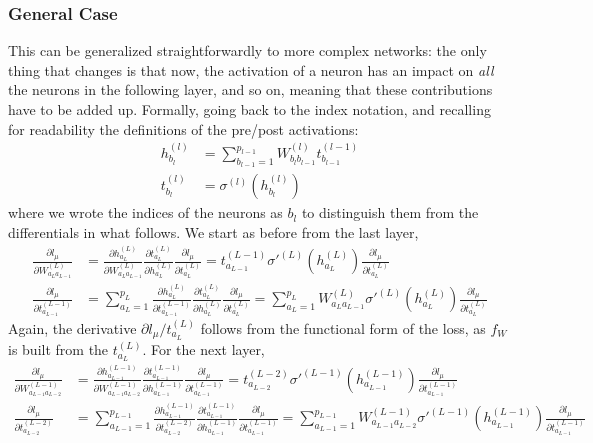 \documentclass{article}
\begin{document}
\subsubsection*{General Case}
This can be generalized straightforwardly to more complex networks: the only thing that changes is that now, the activation of a neuron has an impact on \emph{all} the neurons in the following layer, and so on, meaning that these contributions have to be added up. Formally, going back to the index notation, and recalling for readability the definitions of the pre/post activations:
\begin{align}
    h^{(l)}_{b_{l}} &=
    \sum_{b_{l-1}=1}^{p_{l-1}} W^{(l)}_{b_{l}b_{l-1}} t^{(l-1)}_{b_{l-1}} \\
    t^{(l)}_{b_{l}} &=
    \sigma^{(l)}(h^{(l)}_{b_{l}})
\end{align}
where we wrote the indices of the neurons as $b_l$ to distinguish them from the differentials in what follows. We start as before from the last layer,
\begin{align}
    \frac{\partial l_{\mu}}{\partial W^{(L)}_{a_L a_{L-1}}}
    &=
    \frac{\partial h^{(L)}_{a_L}}{\partial W^{(L)}_{a_L a_{L-1}}}
    \frac{\partial t^{(L)}_{a_L}}{\partial h^{(L)}_{a_L}}
    \frac{\partial l_{\mu}}{\partial t^{(L)}_{a_L}}
    = t^{(L-1)}_{a_{L-1}} \sigma'^{(L)} (h^{(L)}_{a_L})
    \frac{\partial l_{\mu}}{\partial t^{(L)}_{a_L}}
     \\
    \frac{\partial l_{\mu}}{\partial t^{(L-1)}_{a_{L-1}}}
    &=
    \sum_{a_L=1}^{p_L}
    \frac{\partial h^{(L)}_{a_L}}{\partial t^{(L-1)}_{a_{L-1}}}
    \frac{\partial t^{(L)}_{a_L}}{\partial h^{(L)}_{a_L}}
    \frac{\partial l_{\mu}}{\partial t^{(L)}_{a_L}}
    =
    \sum_{a_L=1}^{p_L}
    W^{(L)}_{a_{L}a_{L-1}}
    \sigma'^{(L)} (h^{(L)}_{a_L})
    \frac{\partial l_{\mu}}{\partial t^{(L)}_{a_L}}
\end{align}
Again, the derivative $\partial l_{\mu} / t^{(L)}_{a_L}$ follows from the functional form of the loss, as $f_W$ is built from the $t^{(L)}_{a_L}$. For the next layer,
\begin{align}
    \frac{\partial l_{\mu}}{\partial W^{(L-1)}_{a_{L-1} a_{L-2}}}
    &=
    \frac{\partial h^{(L-1)}_{a_{L-1}}}{\partial W^{(L-1)}_{a_{L-1} a_{L-2}}}
    \frac{\partial t^{(L-1)}_{a_{L-1}}}{\partial h^{(L-1)}_{a_{L-1}}}
    \frac{\partial l_{\mu}}{\partial t^{(L-1)}_{a_{L-1}}}
    = t^{(L-2)}_{a_{L-2}} \sigma'^{(L-1)} (h^{(L-1)}_{a_{L-1}})
    \frac{\partial l_{\mu}}{\partial t^{(L-1)}_{a_{L-1}}}
     \\
    \frac{\partial l_{\mu}}{\partial t^{(L-2)}_{a_{L-2}}}
    &=
    \sum_{a_{L-1}=1}^{p_{L-1}}
    \frac{\partial h^{(L-1)}_{a_{L-1}}}{\partial t^{(L-2)}_{a_{L-2}}}
    \frac{\partial t^{(L-1)}_{a_{L-1}}}{\partial h^{(L-1)}_{a_{L-1}}}
    \frac{\partial l_{\mu}}{\partial t^{(L-1)}_{a_{L-1}}}
    =
    \sum_{a_{L-1}=1}^{p_{L-1}}
    W^{(L-1)}_{a_{L-1}a_{L-2}}
    \sigma'^{(L-1)} (h^{(L-1)}_{a_{L-1}})
    \frac{\partial l_{\mu}}{\partial t^{(L-1)}_{a_{L-1}}}
\end{align}
\end{document}
